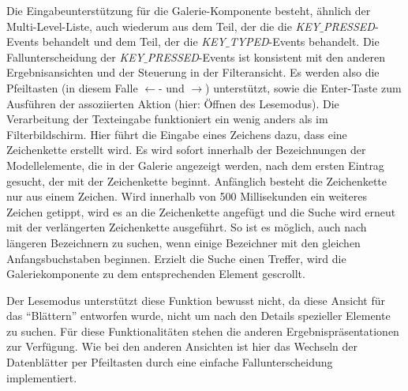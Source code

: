 Die Eingabeunterstützung für die Galerie-Komponente besteht, ähnlich der Multi-Level-Liste, auch wiederum aus dem Teil, der die die \textit{KEY$\_$PRESSED}-Events behandelt und dem Teil, der die \textit{KEY$\_$TYPED}-Events behandelt. Die Fallunterscheidung der \textit{KEY$\_$PRESSED}-Events ist konsistent mit den anderen Ergebnisansichten und der Steuerung in der Filteransicht. Es werden also die Pfeiltasten (in diesem Falle $\leftarrow$- und $\rightarrow$) unterstützt, sowie die Enter-Taste zum Ausführen der assoziierten Aktion (hier: Öffnen des Lesemodus). Die Verarbeitung der Texteingabe funktioniert ein wenig anders als im Filterbildschirm. Hier führt die Eingabe eines Zeichens dazu, dass eine Zeichenkette erstellt wird. Es wird sofort innerhalb der Bezeichnungen der Modellelemente, die in der Galerie angezeigt werden, nach dem ersten Eintrag gesucht, der mit der Zeichenkette beginnt. Anfänglich besteht die Zeichenkette nur aus einem Zeichen. Wird innerhalb von 500 Millisekunden ein weiteres Zeichen getippt, wird es an die Zeichenkette angefügt und die Suche wird erneut mit der verlängerten Zeichenkette ausgeführt. So ist es möglich, auch nach längeren Bezeichnern zu suchen, wenn einige Bezeichner mit den gleichen Anfangsbuchstaben beginnen. Erzielt die Suche einen Treffer, wird die Galeriekomponente zu dem entsprechenden Element gescrollt.\par
Der Lesemodus unterstützt diese Funktion bewusst nicht, da diese Ansicht für das \enquote{Blättern} entworfen wurde, nicht um nach den Details spezieller Elemente zu suchen. Für diese Funktionalitäten stehen die anderen Ergebnispräsentationen zur Verfügung. Wie bei den anderen Ansichten ist hier das Wechseln der Datenblätter per Pfeiltasten durch eine einfache Fallunterscheidung implementiert. \par